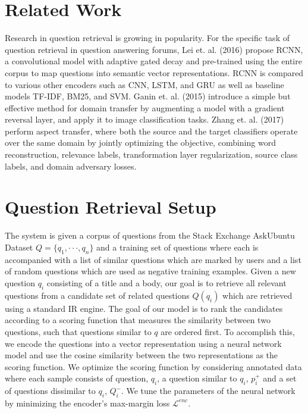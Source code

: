 \documentclass[11pt,a4paper]{article}
\begin{document}
\section{Related Work}
Research in question retrieval is growing in popularity. For the specific task of question retrieval in question answering forums, Lei et. al. (2016) propose RCNN, a convolutional model with adaptive gated decay and pre-trained using the entire corpus to map questions into semantic vector representations. RCNN is compared to various other encoders such as CNN, LSTM, and GRU as well as baseline models TF-IDF, BM25, and SVM. Ganin et. al. (2015) introduce a simple but effective method for domain transfer by augmenting a model with a gradient reversal layer, and apply it to image classification tasks. Zhang et. al. (2017) perform aspect transfer, where both the source and the target classifiers operate over the same domain by jointly optimizing the objective, combining word reconstruction, relevance labels, transformation layer regularization, source class labels, and domain adversary losses.

\section{Question Retrieval Setup}
The system is given a corpus of questions from the Stack Exchange AskUbuntu Dataset \cite{lei} $Q = \{q_1, · · · , q_n\}$ and a training set of questions where each is accompanied with a list of similar questions which are marked by users and a list of random questions which are used as negative training examples. Given a new question $q_i$ consisting of a title and a body, our goal is to retrieve all relevant questions from a candidate set of related questions $Q(q_i)$ which are retrieved using a standard IR engine. The goal of our model is to rank the candidates according to a scoring function that measures the similarity between two questions, such that questions similar to $q$ are ordered first. To accomplish this, we encode the questions into a vector representation using a neural network model and use the cosine similarity between the two representations as the scoring function. We optimize the scoring function by considering annotated data where each sample consists of question, $q_i$, a question similar to $q_i$, $p^+_i$ and a set of questions dissimilar to $q_i$, $Q^-_i$. We tune the parameters of the neural network by minimizing the encoder's max-margin loss $\mathcal{L}^{enc}$. 
\end{document}
